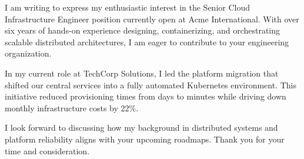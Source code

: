 \documentclass[
    english,            %
    color-default,      %
]{tidylatexcv}
\begin{document}

\begin{tlcvinfo}
\end{tlcvinfo}


\begin{tlcvcoverletter}
    I am writing to express my enthusiastic interest in the Senior Cloud Infrastructure Engineer position currently open at Acme International. With over six years of hands-on experience designing, containerizing, and orchestrating scalable distributed architectures, I am eager to contribute to your engineering organization.

    In my current role at TechCorp Solutions, I led the platform migration that shifted our central services into a fully automated Kubernetes environment. This initiative reduced provisioning times from days to minutes while driving down monthly infrastructure costs by 22\%.

    I look forward to discussing how my background in distributed systems and platform reliability aligns with your upcoming roadmaps. Thank you for your time and consideration.
\end{tlcvcoverletter}

\tlcvsignature[Rome]

\newpage
\end{document}
